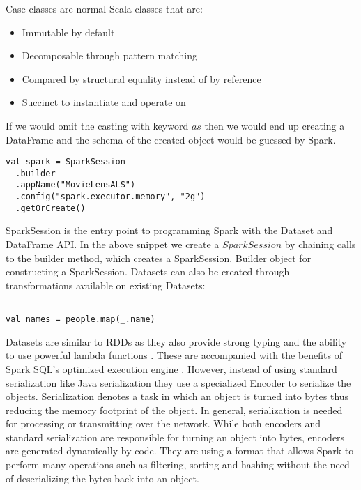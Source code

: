 \documentclass[main.tex]{thesis.tex}
\begin{document}
Case classes are normal Scala classes that are:

\begin{itemize}
	\item Immutable by default
	\item Decomposable through pattern matching
	\item Compared by structural equality instead of by reference
	\item Succinct to instantiate and operate on
\end{itemize}

If we would omit the casting with keyword $as$ then we would end up creating a DataFrame and the schema of the created object would be guessed by Spark.

\begin{lstlisting}[caption=Creating a SparkSession]
val spark = SparkSession
  .builder
  .appName("MovieLensALS")
  .config("spark.executor.memory", "2g")
  .getOrCreate()
\end{lstlisting}

SparkSession is the entry point to programming Spark with the Dataset and DataFrame API. In the above snippet we create a $SparkSession$ by chaining calls to the builder method, which creates a SparkSession. Builder object for constructing a SparkSession. 
Datasets can also be created through transformations available on existing Datasets:

\begin{lstlisting}[caption=Creating a new Dataset through a transformation]

val names = people.map(_.name)

\end{lstlisting}

\cite{spark-dataset}

Datasets are similar to RDDs as they also provide strong typing and the ability to use powerful lambda functions \cite{spark-sql-programming-guide}. These are accompanied with the benefits of Spark SQL's optimized execution engine \cite{spark-sql-programming-guide}. However, instead of using standard serialization like Java serialization they use a specialized Encoder to serialize the objects.
Serialization denotes a task in which an object is turned into bytes thus reducing the memory footprint of the object.
In general, serialization is needed for processing or transmitting over the network.
While both encoders and standard serialization are responsible for turning an object into bytes, encoders are generated dynamically by code. They are using a format that allows Spark to perform many operations such as filtering, sorting and hashing without the need of deserializing the bytes back into an object. \cite{spark-programming-guide}
\end{document}
